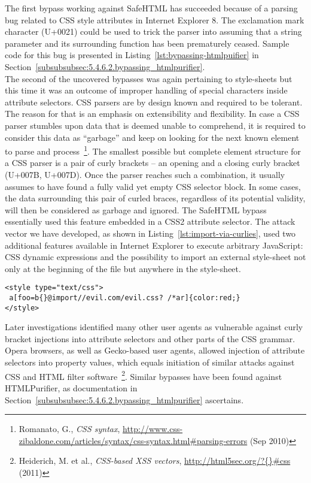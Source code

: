       The first bypass working against SafeHTML has succeeded because of a parsing bug related to CSS style attributes in Internet Explorer 8. The exclamation mark character (U+0021) could be used to trick the parser into assuming that a string parameter and its surrounding function has been prematurely ceased. Sample code for this bug is presented in Listing~\ref{lst:bypassing-htmlpuifier} in Section~\ref{subsubsubsec:5.4.6.2.bypassing_htmlpurifier}. \\
      The second of the uncovered bypasses was again pertaining to style-sheets but this time it was an outcome of improper handling of special characters inside attribute selectors. CSS parsers are by design known and required to be tolerant. The reason for that is an emphasis on extensibility and flexibility. In case a CSS parser stumbles upon data that is deemed unable to comprehend, it is required to consider this data as ``garbage'' and keep on looking for the next known element to parse and process~\footnote{Romanato, G., \textit{CSS syntax}, \url{http://www.css-zibaldone.com/articles/syntax/css-syntax.html#parsing-errors} (Sep 2010)}. The smallest possible but complete element structure for a CSS parser is a pair of curly brackets -- an opening and a closing curly bracket (U+007B, U+007D). Once the parser reaches such a combination, it usually assumes to have found a fully valid yet empty CSS selector block. In some cases, the data surrounding this pair of curled braces, regardless of its potential 
validity, will then be considered as garbage and ignored. The SafeHTML bypass essentially used this feature embedded in a CSS2 attribute selector. The attack vector we have developed, as shown in Listing~\ref{lst:import-via-curlies}, used two additional features available in Internet Explorer to execute arbitrary JavaScript: CSS dynamic expressions and the possibility to import an external style-sheet not only at the beginning of the file but anywhere in the style-sheet. 

\begin{lstlisting}[label=lst:import-via-curlies,caption=Bypassing SafeHTML via curlies in attribute selectors; enabling an import of malicious CSS data from a different origin,captionpos=b]
<style type="text/css">
 a[foo=b{}@import//evil.com/evil.css? /*ar]{color:red;}
</style>
\end{lstlisting}

      Later investigations identified many other user agents as vulnerable against curly bracket injections into attribute selectors and other parts of the CSS grammar. Opera browsers, as well as Gecko-based user agents, allowed injection of attribute selectors into property values, which equals initiation of similar attacks against CSS and HTML filter software~\footnote{Heiderich, M. et al., \textit{CSS-based XSS vectors}, \url{http://html5sec.org/?\{\}#css} (2011)}. Similar bypasses have been found against HTMLPurifier, as documentation in Section~\ref{subsubsubsec:5.4.6.2.bypassing_htmlpurifier} ascertains.\\

